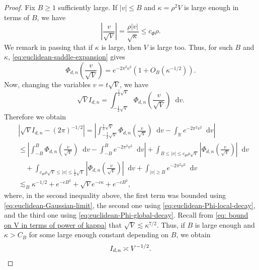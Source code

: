 \documentclass{article}
\newcommand{\R}{\mathbb R}
\newcommand{\dd}{\mathop{}\!\mathrm{d}}
\theoremstyle{plain}
\numberwithin{equation}{section}
\begin{document}
\begin{proof}
Fix $B\geq1$ sufficiently large. If $|v|\leq B$ and $\kappa=\rho^2V$ is large enough in terms
of $B$, we have
\[
 \left|\frac v{\sqrt V}\right|
 =\frac{\rho|v|}{\sqrt\kappa}
 \leq c_\Phi\rho.
\]
We remark in passing that if $\kappa$ is large, then $V$ is large too.
Thus, for such $B$ and $\kappa$,
\eqref{eq:euclidean-saddle-expansion} gives
\begin{equation}\label{eq:euclidean-Gaussian-limit}
 \Phi_{d,n}\left(\frac v{\sqrt V}\right)
 =e^{-2\pi^2v^2}\left(1+O_B(\kappa^{-1/2})\right).
\end{equation}
Now, changing the variables $v=t\sqrt V$, we have
\begin{equation*}
 \sqrt V I_{d,n}
 =\int_{-\frac12\sqrt V}^{\frac12\sqrt V}
 \Phi_{d,n}\left(\frac v{\sqrt V}\right)\dd v.
\end{equation*}
Therefore we obtain
\begin{align*}
 &\left|\sqrt V I_{d,n}-(2\pi)^{-1/2}\right|
 =\left|
 \int_{-\frac12\sqrt V}^{\frac12\sqrt V}
 \Phi_{d,n}\left(\frac v{\sqrt V}\right)\dd v
 -\int_{\R}e^{-2\pi^2v^2}\dd v
 \right| \\
 &\leq
 \left|
 \int_{-B}^{B}
 \Phi_{d,n}\left(\frac v{\sqrt V}\right)\dd v
 -\int_{-B}^{B}e^{-2\pi^2v^2}\dd v
 \right|
 +\int_{B\leq|v|\leq{c_\Phi}\rho\sqrt V}
 \left|\Phi_{d,n}\left(\frac v{\sqrt V}\right)\right|\dd v \\
 &\quad+
 \int_{{c_\Phi}\rho\sqrt V\leq|v|\leq\frac12\sqrt V}
 \left|\Phi_{d,n}\left(\frac v{\sqrt V}\right)\right|\dd v
 +\int_{|v|\geq B}e^{-2\pi^2v^2}{\dd v} \\
 &\lesssim_{B}
 \kappa^{-1/2}+e^{-cB^2}+\sqrt V e^{-c\kappa}+e^{-cB^2},
\end{align*}
where, in the second inequality above,
the first term was bounded using \eqref{eq:euclidean-Gaussian-limit},
the second one using \eqref{eq:euclidean-Phi-local-decay},
and the third one using \eqref{eq:euclidean-Phi-global-decay}.
Recall from \eqref{eq: bound on V in terms of power of kappa} that
$\sqrt V\lesssim\kappa^{7/2}$. Thus, if $B$ is large enough and
$\kappa>C_B$ for some large enough constant depending on $B$, we obtain
\begin{equation}\label{eq: I_d,n comparable with V^{-1/2}}
 I_{d,n}\asymp V^{-1/2}.
\end{equation}


\end{proof}
\end{document}
